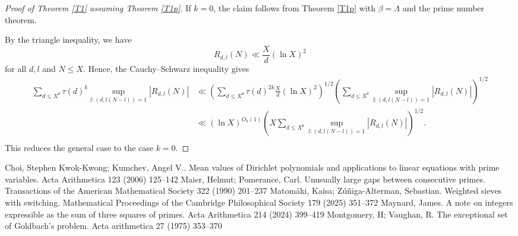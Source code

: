 \documentclass[10pt,a4paper]{amsart}
\newcommand{\1}{
    \bm{1}
}
\begin{document}
\begin{proof}[Proof of Theorem \ref{T1} assuming Theorem \ref{T1p}]
If $k=0$, the claim follows from Theorem \ref{T1p} with $\beta = \Lambda$ and the prime number theorem. 

By the triangle inequality, we have 
\[ R_{d,l}(N) \ll \frac{X}{d} (\ln{X})^2 \]
for all $d,l$ and $N \leq X$. Hence, the Cauchy--Schwarz inequality gives
\begin{align*}
\sum_{d \leq X^{\theta}} \tau(d)^k \sup_{l:(d,l(N-l))=1} |R_{d,l}(N)| &\ll \left( \sum_{d \leq X^{\theta}} \tau(d)^{2k} \frac{X}{d} (\ln{X})^2 \right)^{1/2} \left( \sum_{d \leq X^{\theta}} \sup_{l:(d,l(N-l))=1} |R_{d,l}(N)| \right)^{1/2} \\
&\ll (\ln{X})^{O_k(1)} \left( X \sum_{d \leq X^{\theta}} \sup_{l:(d,l(N-l))=1} |R_{d,l}(N)| \right)^{1/2}. \\
\end{align*}
This reduces the general case to the case $k=0$. 
\end{proof}


\begin{thebibliography}{99}
 Choi, Stephen Kwok-Kwong; Kumchev, Angel V.. Mean values of {Dirichlet} polynomials and applications to linear equations with prime variables. Acta Arithmetica 123 (2006) 125--142
 Maier, Helmut; Pomerance, Carl. Unusually large gaps between consecutive primes. Transactions of the American Mathematical Society 322 (1990) 201--237
 Matom{\"a}ki, Kaisa; Z{\'u}{\~n}iga-Alterman, Sebastian. Weighted sieves with switching. Mathematical Proceedings of the Cambridge Philosophical Society 179 (2025) 351--372
 Maynard, James. A note on integers expressible as the sum of three squares of primes. Acta Arithmetica 214 (2024) 399--419
 Montgomery, H; Vaughan, R. The exceptional set of Goldbach's problem. Acta arithmetica 27 (1975) 353--370
\end{thebibliography}
\end{document}
